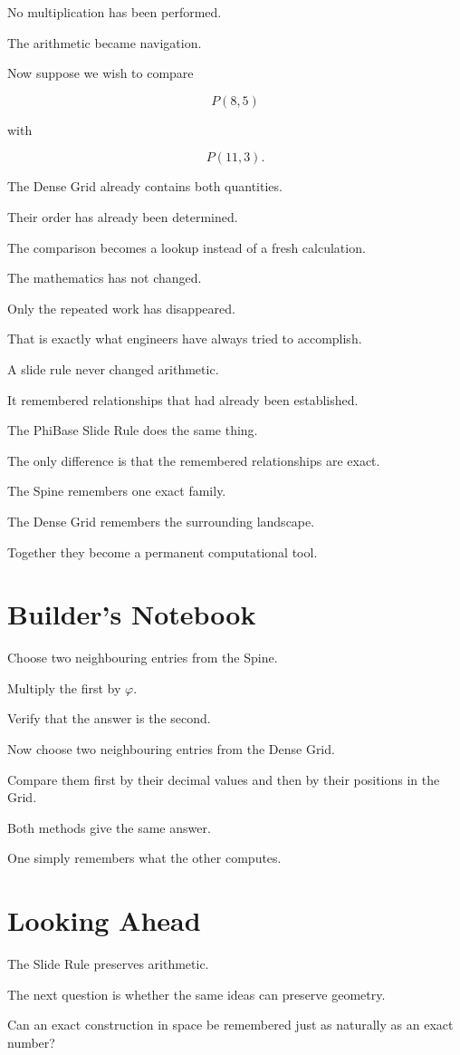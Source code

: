 No multiplication has been performed.

The arithmetic became navigation.

Now suppose we wish to compare

\[
P(8,5)
\]

with

\[
P(11,3).
\]

The Dense Grid already contains both quantities.

Their order has already been determined.

The comparison becomes a lookup instead of a fresh calculation.

The mathematics has not changed.

Only the repeated work has disappeared.

That is exactly what engineers have always tried to accomplish.

A slide rule never changed arithmetic.

It remembered relationships that had already been established.

The PhiBase Slide Rule does the same thing.

The only difference is that the remembered relationships are exact.

The Spine remembers one exact family.

The Dense Grid remembers the surrounding landscape.

Together they become a permanent computational tool.

\section*{Builder's Notebook}

Choose two neighbouring entries from the Spine.

Multiply the first by \(\varphi\).

Verify that the answer is the second.

Now choose two neighbouring entries from the Dense Grid.

Compare them first by their decimal values and then by their positions in the Grid.

Both methods give the same answer.

One simply remembers what the other computes.

\section*{Looking Ahead}

The Slide Rule preserves arithmetic.

The next question is whether the same ideas can preserve geometry.

Can an exact construction in space be remembered just as naturally as an exact number?
